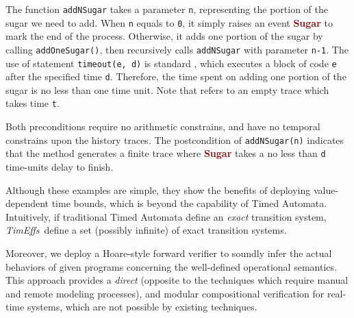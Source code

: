 \documentclass[acmsmall,10pt,review]{acmart}
\newcommand{\codem}[1]{{\lstinline[basicstyle=\small\ttfamily]|#1|}}
\newcommand{\timedEffects}{\emph{TimEffs}}
\newcommand{\effect}{{\ensuremath{\mathrm{\Phi}}}}
\newcommand{\anyevent}[1]{{\textcolor{darkred}
{{\textbf{\footnotesize #1}}}}}
\newcommand{\code}[1]{{\tt{\ensuremath{\m{#1}}}}}
\newcommand{\m}{\mathit}
\newcommand{\mysharp}{{\mathrel{\texttt{\#}}}}
\def\defeq{\ensuremath{\,\triangleq}}
\begin{document}
The function \codem{addNSugar} takes a parameter \codem{n}, representing 
the portion of the sugar we need to add. When \codem{n} 
equals to \codem{0}, 
it simply raises an event \anyevent{Sugar} to mark the end of the process. 
Otherwise, it adds one portion of the sugar by calling
\codem{addOneSugar()}, then recursively calls 
\codem{addNSugar} with parameter \codem{n-1}. 
The use of statement \lstinline|timeout(e, d)| is standard \cite{JSTO}, 
which executes a block of code \codem{e} after the specified time \codem{d}.
Therefore, the time spent on adding one portion of the sugar is 
no less than one time unit. Note that {\color{darklavender}\code{\emph{emp\#t}}} 
refers to an empty trace which takes time \codem{t}. 

Both preconditions require no arithmetic constrains,   
and  have no temporal constrains upon 
the history traces. 
The postcondition of \codem{addNSugar(n)} indicates that  the method 
generates a finite trace where \anyevent{Sugar} takes a no 
less 
than \codem{d} time-units delay to finish. 

Although these examples are simple, they show the benefits of deploying 
value-dependent 
time bounds, which is beyond the capability of Timed Automata. Intuitively, if traditional Timed Automata define an 
\emph{exact} transition system, \timedEffects\ define 
a set (possibly infinite) of exact transition systems. 


Moreover, we deploy a Hoare-style forward verifier to 
soundly infer the actual behaviors of given programs 
concerning the well-defined operational semantics. 
This approach provides a 
\emph{direct} (opposite to the techniques which require 
 manual and remote modeling processes), 
  and modular compositional 
verification for real-time systems, which are not possible
by existing techniques. 




   


\begin{comment}
  we express, the effects of \code{addNSugar(d)} as:
\begin{align*}
&\code{\effect^{send (d)} \defeq \  (0 {<} d {\leq}5 \wedge  0 {\leq} t {<} d),  ({\anyevent{Send} \mysharp  t)} \cdot \anyevent{Done}}.
\end{align*}  
effects of \code{addNSugar(n)} as:
\code{(n{>}0  \wedge  t {\geq} n) : ({Sugar \mysharp  t)}}

\end{comment}
\end{document}
